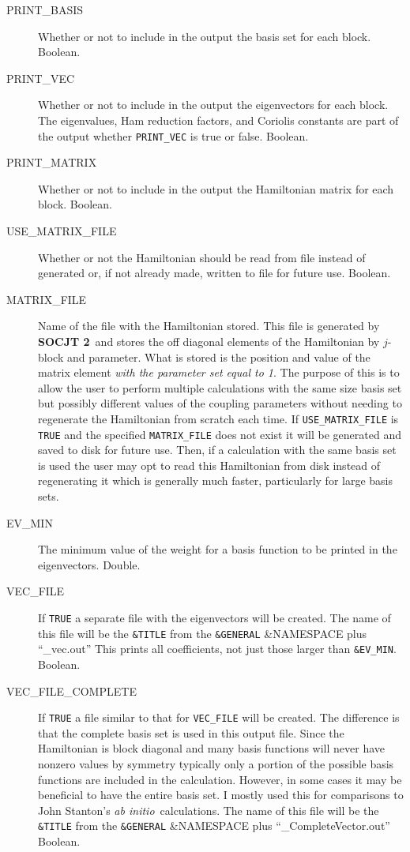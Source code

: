 \documentclass{article}
\newcommand{\ai}{{\it ab initio}}
\newcommand{\socjttwo}{{\bf SOCJT 2}}
\begin{document}
\begin{description}

\item[PRINT\_BASIS] Whether or not to include in the output the basis
  set for each block. Boolean.

\item[PRINT\_VEC] Whether or not to include in the output the eigenvectors
  for each block. The eigenvalues, Ham reduction factors, and Coriolis
  constants are part of the output whether {\tt PRINT\_VEC} is true or
  false. Boolean.

\item[PRINT\_MATRIX] Whether or not to include in the output the Hamiltonian
  matrix for each block. Boolean.
  
  \item[USE\_MATRIX\_FILE] Whether or not the Hamiltonian should be read from file instead of generated or, if not already made, written to file for future use. Boolean.
  
  \item[MATRIX\_FILE] Name of the file with the Hamiltonian stored. This file is generated by \socjttwo\ and stores the off diagonal elements of the Hamiltonian by $j$-block and parameter. What is stored is the position and value of the matrix element \emph{with the parameter set equal to 1}. The purpose of this is to allow the user to perform multiple calculations with the same size basis set but possibly different values of the coupling parameters without needing to regenerate the Hamiltonian from scratch each time. If {\tt USE\_MATRIX\_FILE} is {\tt TRUE} and the specified {\tt MATRIX\_FILE} does not exist it will be generated and saved to disk for future use. Then, if a calculation with the same basis set is used the user may opt to read this Hamiltonian from disk instead of regenerating it which is generally much faster, particularly for large basis sets. 
  
\item[EV\_MIN] The minimum value of the weight for a basis function to be 
  printed in the eigenvectors. Double.

\item[VEC\_FILE] If {\tt TRUE} a separate file with the eigenvectors will be created. The name of this file will be the {\tt \&TITLE} from the {\tt \&GENERAL} \&NAMESPACE plus ``\_vec.out'' This prints all coefficients, not just those larger than {\tt \&EV\_MIN}. Boolean.

\item[VEC\_FILE\_COMPLETE] If {\tt TRUE} a file similar to that for {\tt VEC\_FILE} will be created. The difference is that the complete basis set is used in this output file. Since the Hamiltonian is block diagonal and many basis functions will never have nonzero values by symmetry typically only a portion of the possible basis functions are included in the calculation. However, in some cases it may be beneficial to have the entire basis set. I mostly used this for comparisons to John Stanton's \ai\ calculations. The name of this file will be the {\tt \&TITLE} from the {\tt \&GENERAL} \&NAMESPACE plus ``\_CompleteVector.out'' Boolean.
\end{description}
\end{document}
